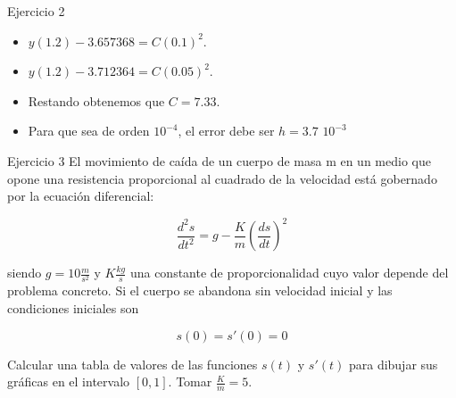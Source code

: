		\begin{frame}{Ejercicio 2}
			\begin{itemize}
				\item $y(1.2) - 3.657368 = C(0.1)^2$.
				\item $y(1.2) - 3.712364 = C(0.05)^2$.
				\item Restando obtenemos que $C=7.33$.
				\item Para que sea de orden $10^{-4}$, el error debe ser $h=3.7$ $10^{-3}$
			\end{itemize}					
			
 
		\end{frame}
				
		\begin{frame}{Ejercicio 3}
			El movimiento de caída de un cuerpo de masa m en un medio que opone una resistencia proporcional al cuadrado de la velocidad está gobernado por la ecuación diferencial:
			
			\begin{equation}
			\frac{d^2s}{dt^2}=g-\frac{K}{m}(\frac{ds}{dt})^2
			\end{equation}
			
			siendo $g=10 \frac{m}{s^2}$ y $K \frac{kg}{s}$ una constante de proporcionalidad cuyo valor depende del problema concreto. Si el cuerpo se abandona sin velocidad inicial y las condiciones iniciales son
			
			
			\begin{equation}
			s(0)=s'(0)=0
			\end{equation}
			
			Calcular una tabla de valores de las funciones $s(t)$ y $s'(t)$ para dibujar sus gráficas en el intervalo $[0,1]$. Tomar $\frac{K}{m}=5$.
		\end{frame}
											
